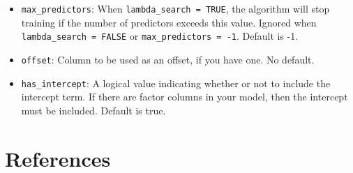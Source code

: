 \documentclass[11pt]{article}
\begin{document}
\begin{itemize}
\item \texttt{max\_predictors}: When \texttt{lambda\_search = TRUE}, the algorithm will stop training if the number of predictors exceeds this value. Ignored when \texttt{ lambda\_search = FALSE} or \texttt{max\_predictors = -1}. Default is -1.
\item \texttt{offset}: Column to be used as an offset, if you have one. No default.
\item \texttt{has\_intercept}: A logical value indicating whether or not to include the intercept term. If there are factor columns in your model, then the intercept must be included. Default is true.


\end{itemize}



\newpage
\section{References}
\end{document}
